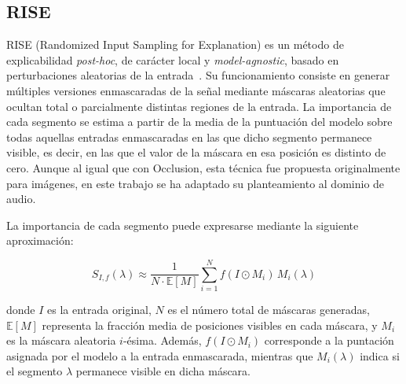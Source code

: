 \subsection{RISE}
\label{subsubsec:eda_rise}

RISE (Randomized Input Sampling for Explanation) es un método de explicabilidad \textit{post-hoc}, de carácter local y \textit{model-agnostic}, basado en perturbaciones aleatorias de la entrada~\parencite{2018rise}. Su funcionamiento consiste en generar múltiples versiones enmascaradas de la señal mediante máscaras aleatorias que ocultan total o parcialmente distintas regiones de la entrada. La importancia de cada segmento se estima a partir de la media de la puntuación del modelo sobre todas aquellas entradas enmascaradas en las que dicho segmento permanece visible, es decir, en las que el valor de la máscara en esa posición es distinto de cero. Aunque al igual que con Occlusion, esta técnica fue propuesta originalmente para imágenes, en este trabajo se ha adaptado su planteamiento al dominio de audio.

La importancia de cada segmento puede expresarse mediante la siguiente aproximación:

\[
S_{I,f}(\lambda) \approx \frac{1}{N \cdot \mathbb{E}[M]} \sum_{i=1}^{N} f(I \odot M_i)\, M_i(\lambda)
\]

donde \(I\) es la entrada original, \(N\) es el número total de máscaras generadas, \(\mathbb{E}[M]\) representa la fracción media de posiciones visibles en cada máscara, y \(M_i\) es la máscara aleatoria \(i\)-ésima. Además, \(f(I \odot M_i)\) corresponde a la puntación asignada por el modelo a la entrada enmascarada, mientras que \(M_i(\lambda)\) indica si el segmento \(\lambda\) permanece visible en dicha máscara.